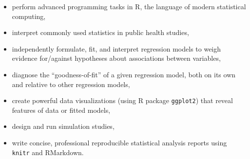 \documentclass[10pt]{article}
\begin{document}
\begin{itemize}
\item perform advanced programming tasks in R, the language of modern statistical computing,
\item interpret commonly used statistics in public health studies,
\item independently formulate, fit, and interpret regression models to weigh evidence for/against hypotheses about associations between variables, 
\item diagnose the ``goodness-of-fit'' of a given regression model, both on its own and relative to other regression models,
\item create powerful data visualizations (using R package {\tt ggplot2}) that reveal features of data or fitted models,
\item design and run simulation studies, 
\item write concise, professional reproducible statistical analysis reports using {\tt knitr} and RMarkdown.
\end{itemize}
    
 \clearpage
{} 

 
\end{document}
